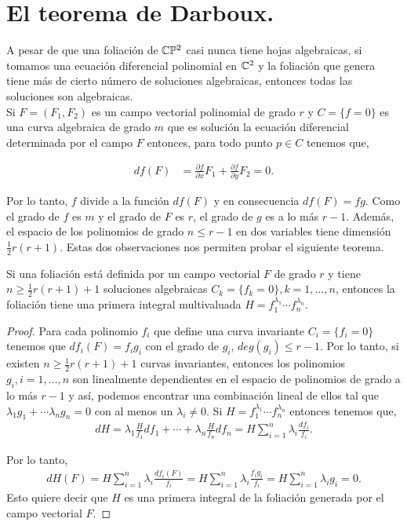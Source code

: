 \section{El teorema de Darboux.} 

A pesar de que una foliación de $\mathbb{C}\mathbb{P}^2$ casi nunca tiene hojas algebraicas, si tomamos una ecuación diferencial polinomial en $\mathbb{C}^{2}$ y la foliación que genera tiene más de cierto número de soluciones algebraicas, entonces todas las soluciones son algebraicas.\\

Si $F=(F_{1},F_{2})$ es un campo vectorial polinomial de grado $r$ y $C=\{f=0\}$ es una curva algebraica de grado $m$ que es solución la ecuación diferencial determinada por el campo $F$ entonces, para todo punto $p\in C$ tenemos que,

\begin{align}
df(F) &=\frac{\partial f}{\partial x}F_{1}+\frac{\partial f}{\partial y}F_{2}=0.
\end{align}

\noindent Por lo tanto, $f$ divide a la función $df(F)$ y en consecuencia $df(F)=fg$. Como el grado de $f$ es $m$ y el grado de $F$ es $r$, el grado de $g$ es a lo más $r-1$. Además, el espacio de los polinomios de grado $n\leq r-1$ en dos variables tiene dimensión $\frac{1}{2}r(r+1)$. Estas dos observaciones nos permiten probar el siguiente teorema.

\begin{Teorema}
\label{Teo:AnteDarboux}
Si una foliación está definida por un campo vectorial $F$ de grado $r$ y tiene $n\geq \frac{1}{2}r(r+1)+1$ soluciones algebraicas $C_{k}=\{f_{k}=0\}, k=1,\ldots,n$, entonces la foliación tiene una primera integral multivaluada $H=f_{1}^{\lambda_{1}}\cdots f_{n}^{\lambda_{n}}$.
\end{Teorema}

\begin{proof}
Para cada polinomio $f_{i}$ que define una curva invariante $C_{i}=\{f_{i}=0\}$ tenemos que $df_{i}(F)=f_{i}g_{i}$ con el grado de $g_{i}$, $deg(g_{i})\leq r-1$. Por lo tanto, si existen $n\geq \frac{1}{2}r(r+1)+1$ curvas invariantes, entonces los polinomios $g_{i}, i=1,\ldots,n$ son linealmente dependientes en el espacio de polinomios de grado a lo más $r-1$ y así, podemos encontrar una combinación lineal de ellos tal que $\lambda_{1}g_{1}+\cdots \lambda_{n}g_{n}=0$ con al menos un $\lambda_{i}\neq 0$. Si $H=f_{1}^{\lambda_{1}}\cdots f_{n}^{\lambda_{n}}$ entonces tenemos que,
\begin {align*}
dH=\lambda_{1}\frac{H}{f_{1}}df_{1}+\cdots+\lambda_{n}\frac{H}{f_{n}}df_{n}=H\sum_{i=1}^{n}\lambda_{i}\frac{df_{i}}{f_{i}}.
\end{align*}

\noindent Por lo tanto,
\begin{align*}
dH(F)=H\sum_{i=1}^{n}\lambda_{i}\frac{df_{i}(F)}{f_{i}}=H\sum_{i=1}^{n}\lambda_{i}\frac{f_{i}g_{i}}{f_{i}}=H\sum_{i=1}^{n}\lambda_{i}g_{i}=0.
\end{align*}
Esto quiere decir que $H$ es una primera integral de la foliación generada por el campo vectorial $F$.
\end{proof}


